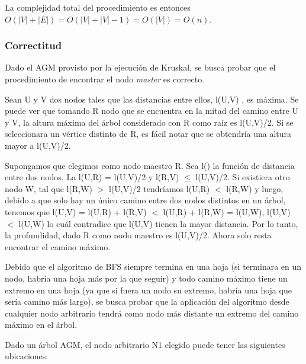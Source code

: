 \documentclass[a4paper, 10pt, twoside]{article}
\begin{document}
La complejidad total del procedimiento es entonces $O(|V| + |E|) = O(|V| + |V| - 1) = O(|V|) = O(n)$.


\subsubsection{Correctitud}

Dado el AGM provisto por la ejecución de Kruskal, se busca probar que el procedimiento de encontrar el nodo \textit{master} es correcto.

Sean U y V dos nodos tales que las distancias entre ellos, l(U,V) , es máxima. Se puede ver que tomando R nodo que se encuentra en la mitad del camino entre U y V, la altura máxima del árbol considerado con R como raíz es l(U,V)/2. Si se seleccionara un vértice distinto de R, es fácil notar que se obtendría una altura mayor a l(U,V)/2.

Supongamos que elegimos como nodo maestro R. Sea l() la función de distancia entre dos nodos. La l(U,R) = l(U,V)/2 y l(R,V) $\leq$ l(U,V)/2. Si existiera otro nodo W, tal que l(R,W) $>$ l(U,V)/2 tendríamos l(U,R) $<$ l(R,W) y luego, debido a que solo hay un único camino entre dos nodos distintos en un árbol, tenemos que l(U,V) = l(U,R) + l(R,V) $<$ l(U,R) + l(R,W) = l(U,W), l(U,V) $<$ l(U,W) lo cuál contradice que l(U,V) tienen la mayor distancia. Por lo tanto, la profundidad, dado R como nodo maestro es l(U,V)/2. Ahora solo resta encontrar el camino máximo.

Debido que el algoritmo de BFS siempre termina en una hoja (si terminara en un nodo, habría una hoja más por la que seguir) y todo camino máximo tiene un extremo en una hoja (ya que si fuera un nodo su extremo, habría una hoja que sería camino más largo), se busca probar que la aplicación del algoritmo desde cualquier nodo arbitrario tendrá como nodo más distante un extremo del camino máximo en el árbol.

Dado un árbol AGM, el nodo arbitrario N1 elegido puede tener las siguientes ubicaciones:
\end{document}
